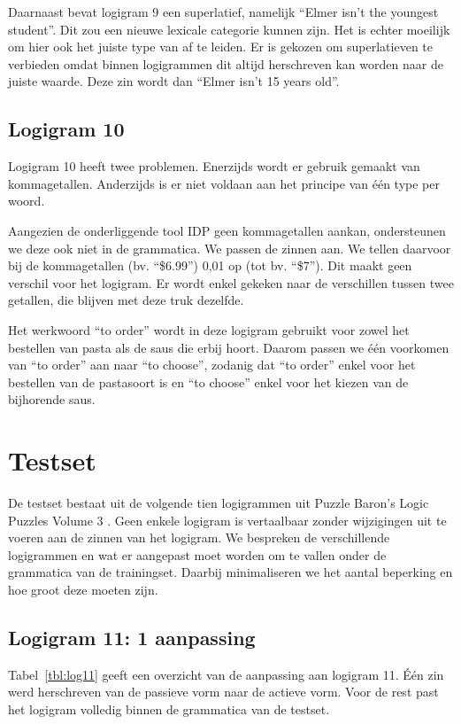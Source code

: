 Daarnaast bevat logigram 9 een superlatief, namelijk ``Elmer isn't the youngest student''. Dit zou een nieuwe lexicale categorie kunnen zijn. Het is echter moeilijk om hier ook het juiste type van af te leiden. Er is gekozen om superlatieven te verbieden omdat binnen logigrammen dit altijd herschreven kan worden naar de juiste waarde. Deze zin wordt dan ``Elmer isn't 15 years old''.

\subsection{Logigram 10}
Logigram 10 heeft twee problemen. Enerzijds wordt er gebruik gemaakt van kommagetallen. Anderzijds is er niet voldaan aan het principe van één type per woord.

Aangezien de onderliggende tool IDP \cite{IDP} geen kommagetallen aankan, ondersteunen we deze ook niet in de grammatica. We passen de zinnen aan. We tellen daarvoor bij de kommagetallen (bv. ``\$6.99'') 0,01 op (tot bv. ``\$7''). Dit maakt geen verschil voor het logigram. Er wordt enkel gekeken naar de verschillen tussen twee getallen, die blijven met deze truk dezelfde.

Het werkwoord ``to order'' wordt in deze logigram gebruikt voor zowel het bestellen van pasta als de saus die erbij hoort. Daarom passen we één voorkomen van ``to order'' aan naar ``to choose'', zodanig dat ``to order'' enkel voor het bestellen van de pastasoort is en ``to choose'' enkel voor het kiezen van de bijhorende saus.

\section{Testset}
De testset bestaat uit de volgende tien logigrammen uit Puzzle Baron's Logic Puzzles Volume 3 \cite{logigrammen}. Geen enkele logigram is vertaalbaar zonder wijzigingen uit te voeren aan de zinnen van het logigram. We bespreken de verschillende logigrammen en wat er aangepast moet worden om te vallen onder de grammatica van de trainingset. Daarbij minimaliseren we het aantal beperking en hoe groot deze moeten zijn. 

\subsection{Logigram 11: 1 aanpassing}
Tabel~\ref{tbl:log11} geeft een overzicht van de aanpassing aan logigram 11. Één zin werd herschreven van de passieve vorm naar de actieve vorm. Voor de rest past het logigram volledig binnen de grammatica van de testset.

